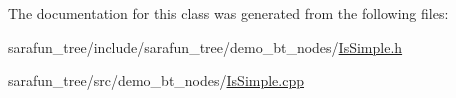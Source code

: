 The documentation for this class was generated from the following files\-:\begin{DoxyCompactItemize}
\item 
sarafun\-\_\-tree/include/sarafun\-\_\-tree/demo\-\_\-bt\-\_\-nodes/\hyperlink{IsSimple_8h}{Is\-Simple.\-h}\item 
sarafun\-\_\-tree/src/demo\-\_\-bt\-\_\-nodes/\hyperlink{IsSimple_8cpp}{Is\-Simple.\-cpp}\end{DoxyCompactItemize}
